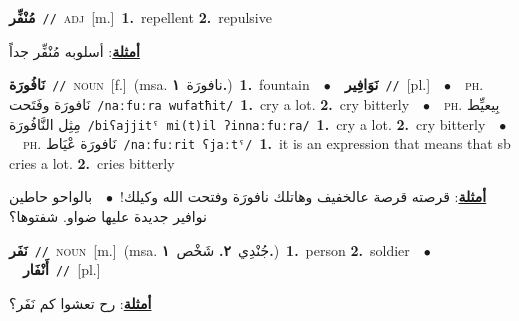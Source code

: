 \documentclass[10pt,a4paper,twoside]{article} %
\begin{document}
\begin{multicols}{2}
{\setlength\topsep{0pt}\textbf{\foreignlanguage{arabic}{مُنْفِّر}}\ {\color{gray}\texttt{//}\color{black}}\ \textsc{adj}\ [m.]\ \textbf{1.}~repellent  \textbf{2.}~repulsive\  \begin{flushright}\color{gray}\foreignlanguage{arabic}{\textbf{\underline{\foreignlanguage{arabic}{أمثلة}}}: أسلوبه مُنْفِّر جداً}\end{flushright}\color{black}} \vspace{2mm}

{\setlength\topsep{0pt}\textbf{\foreignlanguage{arabic}{نَافُورَة}}\ {\color{gray}\texttt{//}\color{black}}\ \textsc{noun}\ [f.]\ \color{gray}(msa. \foreignlanguage{arabic}{نافورَة}~\foreignlanguage{arabic}{\textbf{١.}})\color{black}\ \textbf{1.}~fountain\ \ $\bullet$\ \ \setlength\topsep{0pt}\textbf{\foreignlanguage{arabic}{نَوَافِير}}\ {\color{gray}\texttt{//}\color{black}}\ [pl.]\ \ $\bullet$\ \ \textsc{ph.} \color{gray} \foreignlanguage{arabic}{نَافورَة وفَتَحت}\color{black}\ {\color{gray}\texttt{/{\sffamily naːfuːra wufatħit}/}\color{black}}\ \textbf{1.}~cry a lot.  \textbf{2.}~cry bitterly\ \ $\bullet$\ \ \textsc{ph.} \color{gray} \foreignlanguage{arabic}{بِيعيِّط مِثِل النَّافُورَة}\color{black}\ {\color{gray}\texttt{/{\sffamily biʕajjitˤ mi(t)il ʔinnaːfuːra}/}\color{black}}\ \textbf{1.}~cry a lot.  \textbf{2.}~cry bitterly\ \ $\bullet$\ \ \textsc{ph.} \color{gray} \foreignlanguage{arabic}{نَافورَة عْيَاط}\color{black}\ {\color{gray}\texttt{/{\sffamily naːfuːrit ʕjaːtˤ}/}\color{black}}\ \textbf{1.}~it is an expression that means that sb cries a lot.  \textbf{2.}~cries bitterly\  \begin{flushright}\color{gray}\foreignlanguage{arabic}{\textbf{\underline{\foreignlanguage{arabic}{أمثلة}}}: قرصته قرصة عالخفيف وهاتلك نافورَة وفتحت الله وكيلك!\ $\bullet$\ \  بالواحو حاطين نوافير جديدة عليها ضواو. شفتوها؟}\end{flushright}\color{black}} \vspace{2mm}

{\setlength\topsep{0pt}\textbf{\foreignlanguage{arabic}{نَفَر}}\ {\color{gray}\texttt{//}\color{black}}\ \textsc{noun}\ [m.]\ \color{gray}(msa. \foreignlanguage{arabic}{جُنْدِي}~\foreignlanguage{arabic}{\textbf{٢.}}  \foreignlanguage{arabic}{شَخْص}~\foreignlanguage{arabic}{\textbf{١.}})\color{black}\ \textbf{1.}~person  \textbf{2.}~soldier\ \ $\bullet$\ \ \setlength\topsep{0pt}\textbf{\foreignlanguage{arabic}{أَنْفَار}}\ {\color{gray}\texttt{//}\color{black}}\ [pl.]\  \begin{flushright}\color{gray}\foreignlanguage{arabic}{\textbf{\underline{\foreignlanguage{arabic}{أمثلة}}}: رح تعشوا كم نَفَر؟}\end{flushright}\color{black}} \vspace{2mm}


\end{multicols}
\end{document}
